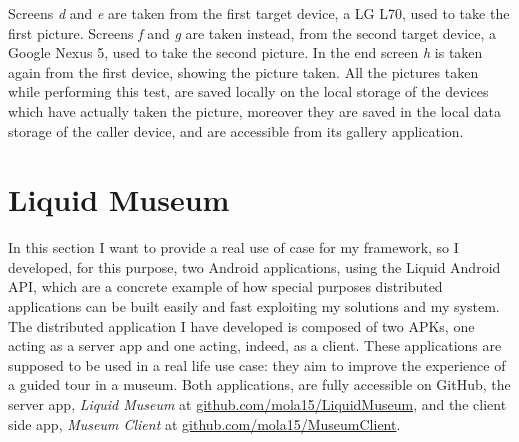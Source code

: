 Screens \textit{d} and \textit{e} are taken from the first target device, a LG L70, used to take the first picture. Screens \textit{f} and \textit{g} are taken instead, from the second target device, a Google Nexus 5, used to take the second picture. In the end screen \textit{h} is taken again from the first device, showing the picture taken. All the pictures taken while performing this test, are saved locally on the local storage of the devices which have actually taken the picture, moreover they are saved in the local data storage of the caller device, and are accessible from its gallery application.

\section{Liquid Museum}
In this section I want to provide a real use of case for my framework, so I developed, for this purpose, two Android applications, using the Liquid Android API, which are a concrete example of how special purposes distributed applications can be built easily and fast exploiting my solutions and my system.\\
The distributed application I have developed is composed of two APKs, one acting as a server app and one acting, indeed, as a client. These applications are supposed to be used in a real life use case: they aim to improve the experience of a guided tour in a museum. Both applications, are fully accessible on GitHub, the server app, \textit{Liquid Museum} at \href{https://github.com/mola15/LiquidMuseum}{github.com/mola15/LiquidMuseum}, and the client side app, \textit{Museum Client} at \href{https://github.com/mola15/MuseumClient}{github.com/mola15/MuseumClient}.
